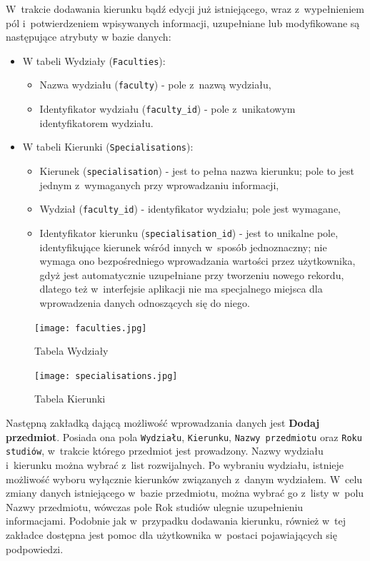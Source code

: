 W~trakcie dodawania kierunku bądź edycji już istniejącego, wraz z~wypełnieniem pól i~potwierdzeniem wpisywanych informacji, uzupełniane lub modyfikowane są następujące atrybuty w bazie danych:
\begin{itemize}
\item W tabeli Wydziały (\verb!Faculties!):
\begin{itemize}
\item Nazwa wydziału (\verb!faculty!) - pole z~nazwą wydziału,
\item Identyfikator wydziału (\verb!faculty_id!) - pole z~unikatowym identyfikatorem wydziału.
\end{itemize}
\item W tabeli Kierunki (\verb!Specialisations!):
\begin{itemize}
\item Kierunek (\verb!specialisation!) - jest to pełna nazwa kierunku; pole to jest jednym z~wymaganych przy wprowadzaniu informacji,
\item Wydział (\verb!faculty_id!) - identyfikator wydziału; pole jest wymagane,
\item Identyfikator kierunku (\verb!specialisation_id!) - jest to unikalne pole, identyfikujące kierunek wśród innych w~sposób jednoznaczny; nie wymaga ono bezpośredniego wprowadzania wartości przez użytkownika, gdyż jest automatycznie uzupełniane przy tworzeniu nowego rekordu, dlatego też w~interfejsie aplikacji nie ma specjalnego miejsca dla wprowadzenia danych odnoszących się do niego.
\end{itemize}
\end{itemize}

\begin{figure}
\begin{center}
\texttt{[image: faculties.jpg]}
\caption{Tabela Wydziały}
\label{fig:faculties}
\end{center}
\end{figure}
\begin{figure}
\begin{center}
\texttt{[image: specialisations.jpg]}
\caption{Tabela Kierunki}
\label{fig:specialisations}
\end{center}
\end{figure}


Następną zakładką dającą możliwość wprowadzania danych jest \textbf{Dodaj przedmiot}. Posiada ona pola \verb!Wydziału!, \verb!Kierunku!, \verb!Nazwy przedmiotu! oraz \verb!Roku studiów!, w~trakcie którego przedmiot jest prowadzony. Nazwy wydziału i~kierunku można wybrać z~list rozwijalnych. Po wybraniu wydziału, istnieje możliwość wyboru wyłącznie kierunków związanych z~danym wydziałem. W~celu zmiany danych istniejącego w~bazie przedmiotu, można wybrać go z~listy w~polu Nazwy przedmiotu, wówczas pole Rok studiów ulegnie uzupełnieniu informacjami. Podobnie jak w~przypadku dodawania kierunku, również w~tej zakładce dostępna jest pomoc dla użytkownika w~postaci pojawiających się podpowiedzi. 


